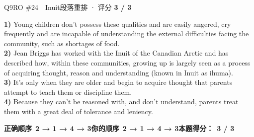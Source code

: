 \begin{qblock}{Q9\quad RO \#24\ \ Inuit}{段落重排 · 评分 \textcolor{cAccent}{\bfseries 3 / 3}}
\begin{promptbox}
\textbf{1)} Young children don't possess these qualities and are easily angered, cry frequently and are incapable of understanding the external difficulties facing the community, such as shortages of food.\\
\textbf{2)} Jean Briggs has worked with the Inuit of the Canadian Arctic and has described how, within these communities, growing up is largely seen as a process of acquiring thought, reason and understanding (known in Inuit as ihuma).\\
\textbf{3)} It's only when they are older and begin to acquire thought that parents attempt to teach them or discipline them.\\
\textbf{4)} Because they can't be reasoned with, and don't understand, parents treat them with a great deal of tolerance and leniency.
\end{promptbox}
\smallskip
\textbf{正确顺序}\ \textcolor{cFix}{\bfseries 2 → 1 → 4 → 3}\qquad\textbf{你的顺序}\ \textcolor{cFix}{\bfseries 2 → 1 → 4 → 3}\qquad\textbf{本题得分：}\ {\color{cAccent}\bfseries 3 / 3}
\end{qblock}


